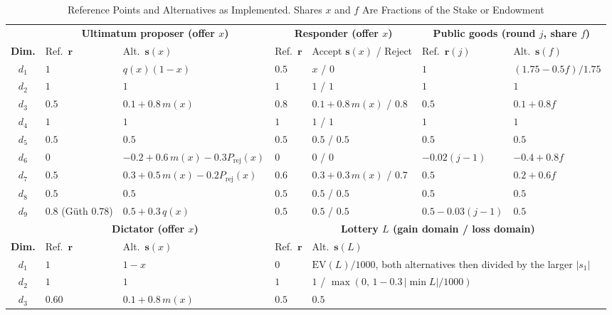 \documentclass[journal]{IEEEtran}
\begin{document}
\begin{table}[!t]
\renewcommand{\arraystretch}{1.18}
\caption{Reference Points and Alternatives as Implemented. Shares $x$ and $f$ Are Fractions of the Stake or Endowment}
\label{tab:encodings}
\centering
\footnotesize
\begin{tabular}{@{}c l l l l l l@{}}
\toprule
& \multicolumn{2}{c}{\textbf{Ultimatum proposer (offer $x$)}} & \multicolumn{2}{c}{\textbf{Responder (offer $x$)}} & \multicolumn{2}{c}{\textbf{Public goods (round $j$, share $f$)}} \\
\cmidrule(lr){2-3}\cmidrule(lr){4-5}\cmidrule(lr){6-7}
\textbf{Dim.} & Ref.\ $\mathbf{r}$ & Alt.\ $\mathbf{s}(x)$ & Ref.\ $\mathbf{r}$ & Accept $\mathbf{s}(x)$ / Reject & Ref.\ $\mathbf{r}(j)$ & Alt.\ $\mathbf{s}(f)$ \\
\midrule
$d_1$ & $1$ & $q(x)(1-x)$ & $0.5$ & $x$ / $0$ & $1$ & $(1.75-0.5f)/1.75$ \\
$d_2$ & $1$ & $1$ & $1$ & $1$ / $1$ & $1$ & $1$ \\
$d_3$ & $0.5$ & $0.1+0.8\,m(x)$ & $0.8$ & $0.1+0.8\,m(x)$ / $0.8$ & $0.5$ & $0.1+0.8f$ \\
$d_4$ & $1$ & $1$ & $1$ & $1$ / $1$ & $1$ & $1$ \\
$d_5$ & $0.5$ & $0.5$ & $0.5$ & $0.5$ / $0.5$ & $0.5$ & $0.5$ \\
$d_6$ & $0$ & $-0.2+0.6\,m(x)-0.3P_{\text{rej}}(x)$ & $0$ & $0$ / $0$ & $-0.02(j-1)$ & $-0.4+0.8f$ \\
$d_7$ & $0.5$ & $0.3+0.5\,m(x)-0.2P_{\text{rej}}(x)$ & $0.6$ & $0.3+0.3\,m(x)$ / $0.7$ & $0.5$ & $0.2+0.6f$ \\
$d_8$ & $0.5$ & $0.5$ & $0.5$ & $0.5$ / $0.5$ & $0.5$ & $0.5$ \\
$d_9$ & $0.8$ (G\"uth $0.78$) & $0.5+0.3\,q(x)$ & $0.5$ & $0.5$ / $0.5$ & $0.5-0.03(j-1)$ & $0.5$ \\
\midrule
& \multicolumn{2}{c}{\textbf{Dictator (offer $x$)}} & \multicolumn{4}{c}{\textbf{Lottery $L$ (gain domain / loss domain)}} \\
\cmidrule(lr){2-3}\cmidrule(lr){4-7}
\textbf{Dim.} & Ref.\ $\mathbf{r}$ & Alt.\ $\mathbf{s}(x)$ & Ref.\ $\mathbf{r}$ & \multicolumn{3}{l}{Alt.\ $\mathbf{s}(L)$} \\
\midrule
$d_1$ & $1$ & $1-x$ & $0$ & \multicolumn{3}{l}{$\mathrm{EV}(L)/1000$, both alternatives then divided by the larger $|s_1|$} \\
$d_2$ & $1$ & $1$ & $1$ & \multicolumn{3}{l}{$1$ / $\max(0,\,1-0.3\,|\min L|/1000)$} \\
$d_3$ & $0.60$ & $0.1+0.8\,m(x)$ & $0.5$ & \multicolumn{3}{l}{$0.5$} \\

\end{tabular}
\end{table}
\end{document}

